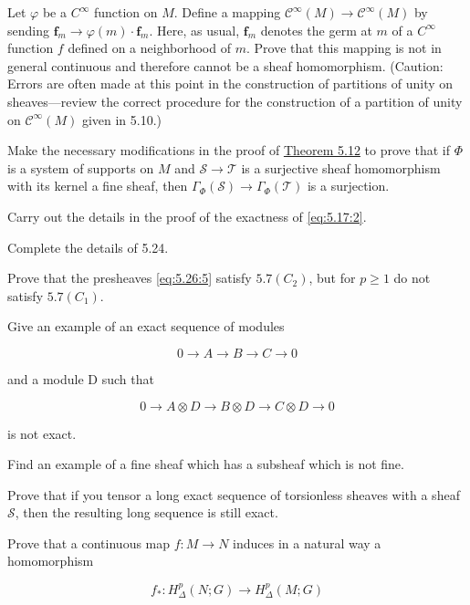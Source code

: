 \begin{problemset}
\item Let $\varphi$ be a $C^{\infty}$ function on $M$. Define a mapping $\mathcal{C}^{\infty}(M) \to \mathcal{C}^{\infty}(M)$ by sending $\mathbf{f}_{m} \to \varphi(m) \cdot \mathbf{f}_{m}$. Here, as usual, $\mathbf{f}_{m}$ denotes the germ at $m$ of a $C^{\infty}$ function $f$ defined on a neighborhood of $m$. Prove that this mapping is not in general continuous and therefore cannot be a sheaf homomorphism. (Caution: Errors are often made at this point in the construction of partitions of unity on sheaves—review the correct procedure for the construction of a partition of unity on $\mathcal{C}^{\infty}(M)$ given in 5.10.)

\item Make the necessary modifications in the proof of \hyperref[thm:5.12]{Theorem 5.12} to prove that if $\Phi$ is a system of supports on $M$ and $\mathcal{S}\to\mathcal{T}$ is a surjective sheaf homomorphism with its kernel a fine sheaf, then $\Gamma_{\Phi}(\mathcal{S})\to\Gamma_{\Phi}(\mathcal{T})$ is a surjection.

\item Carry out the details in the proof of the exactness of \eqref{eq:5.17:2}.

\item Complete the details of 5.24.

\item Prove that the presheaves \eqref{eq:5.26:5} satisfy $5.7(C_2)$, but for $p\geq1$ do not satisfy $5.7(C_1)$.

\item Give an example of an exact sequence of modules

\[
0\to A\to B\to C\to0
\]

and a module D such that

\[
0\to A\otimes D\to B\otimes D\to C\otimes D\to0
\]

is not exact.

\item Find an example of a fine sheaf which has a subsheaf which is not fine.

\item Prove that if you tensor a long exact sequence of torsionless sheaves with a sheaf $\mathcal{S}$, then the resulting long sequence is still exact.

\item Prove that a continuous map $f\colon M\to N$ induces in a natural way a homomorphism

\[
f_{*}\colon H_{\Delta}^{p}(N;G)\to H_{\Delta}^{p}(M;G)
\]


\end{problemset}
